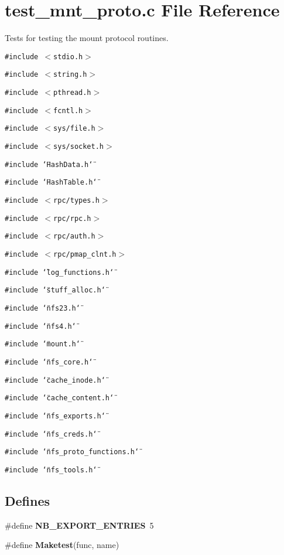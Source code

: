 \section{test\_\-mnt\_\-proto.c File Reference}
\label{test__mnt__proto_8c}
Tests for testing the mount protocol routines. 

{\tt \#include $<$stdio.h$>$}\par
{\tt \#include $<$string.h$>$}\par
{\tt \#include $<$pthread.h$>$}\par
{\tt \#include $<$fcntl.h$>$}\par
{\tt \#include $<$sys/file.h$>$}\par
{\tt \#include $<$sys/socket.h$>$}\par
{\tt \#include \char`\"{}Hash\-Data.h\char`\"{}}\par
{\tt \#include \char`\"{}Hash\-Table.h\char`\"{}}\par
{\tt \#include $<$rpc/types.h$>$}\par
{\tt \#include $<$rpc/rpc.h$>$}\par
{\tt \#include $<$rpc/auth.h$>$}\par
{\tt \#include $<$rpc/pmap\_\-clnt.h$>$}\par
{\tt \#include \char`\"{}log\_\-functions.h\char`\"{}}\par
{\tt \#include \char`\"{}stuff\_\-alloc.h\char`\"{}}\par
{\tt \#include \char`\"{}nfs23.h\char`\"{}}\par
{\tt \#include \char`\"{}nfs4.h\char`\"{}}\par
{\tt \#include \char`\"{}mount.h\char`\"{}}\par
{\tt \#include \char`\"{}nfs\_\-core.h\char`\"{}}\par
{\tt \#include \char`\"{}cache\_\-inode.h\char`\"{}}\par
{\tt \#include \char`\"{}cache\_\-content.h\char`\"{}}\par
{\tt \#include \char`\"{}nfs\_\-exports.h\char`\"{}}\par
{\tt \#include \char`\"{}nfs\_\-creds.h\char`\"{}}\par
{\tt \#include \char`\"{}nfs\_\-proto\_\-functions.h\char`\"{}}\par
{\tt \#include \char`\"{}nfs\_\-tools.h\char`\"{}}\par
\subsection*{Defines}
\begin{CompactItemize}
\item 
\#define {\bf NB\_\-EXPORT\_\-ENTRIES}\ 5
\item 
\#define {\bf Maketest}(func, name)
\end{CompactItemize}
